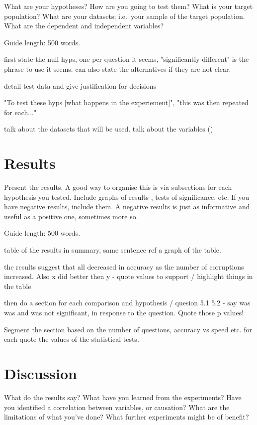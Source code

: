 \documentclass{csfourzero}
\begin{document}
What are your hypotheses? How are you going to test them? What is your
target population? What are your datasets; i.e.\ your sample of the
target population. What are the dependent and independent variables?

Guide length: 500 words.

first state the null hyps, one per question it seems, "significantly different" is the phrase to use it seems. can also state the alternatives if they are not clear.

detail test data and give justification for decisions

"To test these hyps [what happens in the experiement]", "this was then repeated for each..."

talk about the datasets that will be used. talk about the variables ()

\section{Results}
\label{sec:results}

Present the results. A good way to organise this is via subsections
for each hypothesis you tested. Include graphs of results
, tests of significance, etc. If you have
negative results, include them. A negative results is just as
informative and useful as a positive one, sometimes more so.

Guide length: 500 words.

table of the results in summary, same sentence ref a graph of the table.

the results suggest that all decreased in accuracy as the number of corruptions increased. Also x did better then y - quote values to support / highlight things in the table

then do a section for each comparison and hypothesis / quesion 5.1 5.2 - say was was and was not significant, in response to the question. Quote those p values!

Segment the section based on the number of questions, accuracy vs speed etc. for each quote the values of the statistical tests.

\section{Discussion}
\label{sec:discuss}

What do the results say? What have you learned from the
experiments? Have you identified a correlation between variables, or
causation? What are the limitations of what you've done? What further
experiments might be of benefit?
\end{document}

